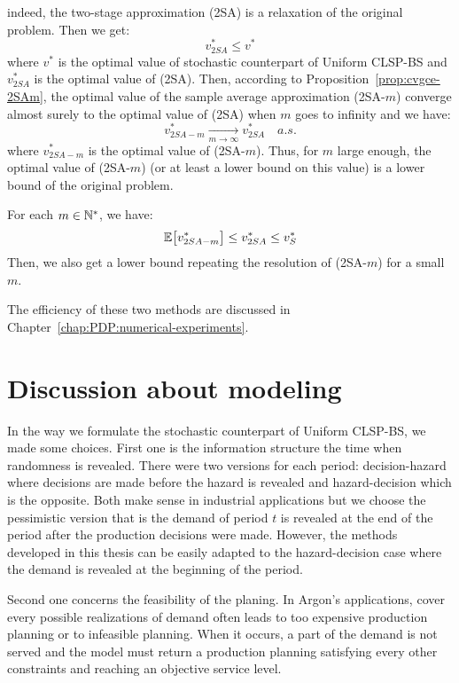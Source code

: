indeed, the two-stage approximation (2SA) is a relaxation of the original problem. Then we get:
\begin{equation}
  v^*_{2SA} \le v^*
\end{equation}
where $v^*$ is the optimal value of stochastic counterpart of Uniform CLSP-BS and $v^*_{2SA}$ is the optimal value of (2SA).
Then, according to Proposition~\ref{prop:cvgce-2SAm}, the optimal value of the sample average approximation (2SA-$m$) converge almost surely to the optimal value of (2SA) when $m$ goes to infinity and we have:
\begin{equation}
  v^*_{2SA-m}  \xrightarrow[m\to\infty]{} v^*_{2SA} \quad a.s.
\end{equation}
where $v^*_{2SA-m}$ is the optimal value of (2SA-$m$).
Thus, for $m$ large enough, the optimal value of (2SA-$m$) (or at least a lower bound on this value) is a lower bound of the original problem.

For each $m\in\mathbb{N}^*$, we have:
\begin{equation}
  \espe\sqbracket{v^*_{2SA-m}}\le v^*_{2SA}\le v^*_S
\end{equation}
Then, we also get a lower bound repeating the resolution of (2SA-$m$) for a small $m$.


The efficiency of these two methods are discussed in Chapter~\ref{chap:PDP:numerical-experiments}.



\section{Discussion about modeling}
\label{sec:stoch-CLSP-BS-discussion}

In the way we formulate the stochastic counterpart of Uniform CLSP-BS, we made some choices. First one is the information structure \ie the time when randomness is revealed. There were two versions for each period: decision-hazard where decisions are made before the hazard is revealed and hazard-decision which is the opposite. Both make sense in industrial applications but we choose the pessimistic version that is the demand of period $t$ is revealed at the end of the period after the production decisions were made. However, the methods developed in this thesis can be easily adapted to the hazard-decision case where the demand is revealed at the beginning of the period.


Second one concerns the feasibility of the planing. In Argon's applications, cover every possible realizations of demand often leads to too expensive production planning or to infeasible planning. When it occurs, a part of the demand is not served and the model must return a production planning satisfying every other constraints and reaching an objective service level.


